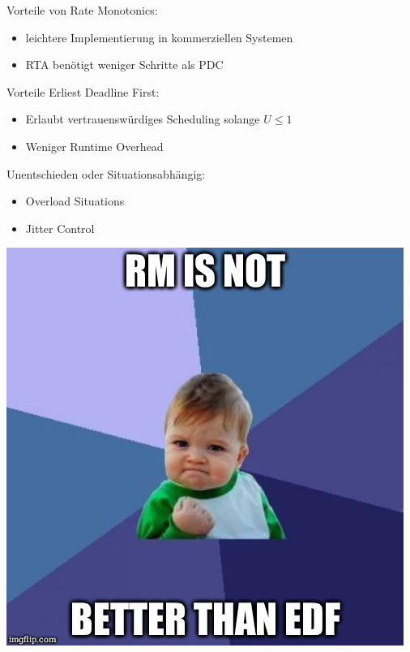 \begin{frame}{\secname}
	Vorteile von Rate Monotonics:\pause
	\begin{itemize}
		\item leichtere Implementierung in kommerziellen Systemen
		\item RTA benötigt weniger Schritte als PDC
	\end{itemize}\pause
	Vorteile Erliest Deadline First:\pause
	\begin{itemize}
		\item Erlaubt vertrauenswürdiges Scheduling solange $U \leq 1$
		\item Weniger Runtime Overhead
	\end{itemize}
	Unentschieden oder Situationsabhängig:\pause
	\begin{itemize}
		\item Overload Situations
		\item Jitter Control
	\end{itemize}
\end{frame}

\begin{frame}{\secname}
	\begin{center}
		\includegraphics[scale=0.35]{graphics/memes/success.jpg}
	\end{center}
\end{frame}

